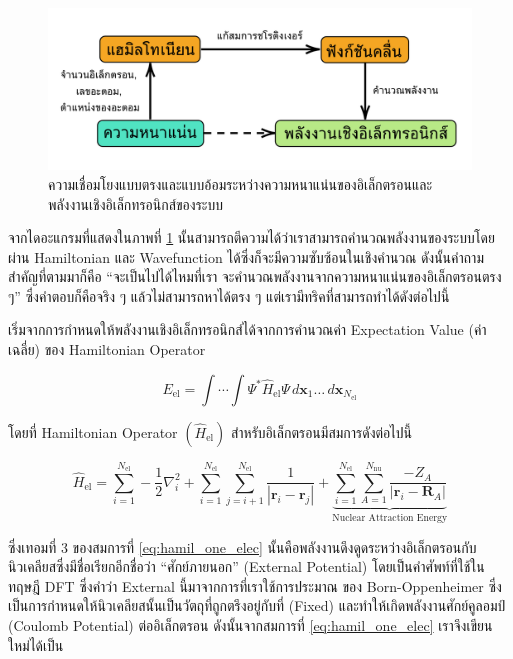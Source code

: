 \begin{figure}[htbp]
    \centering
    \includegraphics[width=\linewidth]{fig/density_wavefunc_ener.png}
    \caption{ความเชื่อมโยงแบบตรงและแบบอ้อมระหว่างความหนาแน่นของอิเล็กตรอนและพลังงานเชิงอิเล็กทรอนิกส์ของระบบ}
    \label{fig:density_wavefunc_ener}
\end{figure}

จากไดอะแกรมที่แสดงในภาพที่ \ref{fig:density_wavefunc_ener} นั้นสามารถตีความได้ว่าเราสามารถคำนวณพลังงานของระบบโดยผ่าน 
Hamiltonian และ Wavefunction ได้ซึ่งก็จะมีความซับซ้อนในเชิงคำนวณ ดังนั้นคำถามสำคัญที่ตามมาก็คือ \enquote{จะเป็นไปได้ไหมที่เรา%
จะคำนวณพลังงานจากความหนาแน่นของอิเล็กตรอนตรง ๆ} ซึ่งคำตอบก็คือจริง ๆ แล้วไม่สามารถหาได้ตรง ๆ แต่เรามีทริคที่สามารถทำได้ดังต่อไปนี้

เริ่มจากการกำหนดให้พลังงานเชิงอิเล็กทรอนิกส์ได้จากการคำนวณค่า Expectation Value (ค่าเฉลี่ย) ของ Hamiltonian Operator 

\begin{equation}\label{eq:ener_expect_value}
    E_{\text{el}} = \int \cdots \int \Psi^{\ast} \hat{H}_{\text{el}} \Psi \, d\bm{x}_{1} \dots \, 
    d\bm{x}_{N_{\text{el}}}
\end{equation}

\noindent โดยที่ Hamiltonian Operator $(\hat{H}_{\text{el}})$ สำหรับอิเล็กตรอนมีสมการดังต่อไปนี้

\begin{equation}\label{eq:hamil_one_elec}
    \hat{H}_{\text{el}} = \sum^{N_{\text{el}}}_{i=1} -\frac{1}{2} \nabla^{2}_{i} 
    + \sum^{N_{\text{el}}}_{i=1} \sum^{N_{\text{el}}}_{j=i+1} \frac{1}{|\bm{r}_{i}-\bm{r}_{j}|}
    + \underbrace{\sum^{N_{\text{el}}}_{i=1} \sum^{N_{\text{nu}}}_{A=1} \frac{-Z_{A}}{|\bm{r}_{i}-\bm{R}_{A}|}}%
    _{\text{Nuclear Attraction Energy}}
\end{equation}

\noindent ซึ่งเทอมที่ 3 ของสมการที่ \ref{eq:hamil_one_elec} นั้นคือพลังงานดึงดูดระหว่างอิเล็กตรอนกับนิวเคลียสซึ่งมีชื่อเรียกอีกชื่อว่า 
\enquote{ศักย์ภายนอก} (External Potential) โดยเป็นคำศัพท์ที่ใช้ในทฤษฎี DFT ซึ่งคำว่า External นี้มาจากการที่เราใช้การประมาณ%
ของ Born-Oppenheimer ซึ่งเป็นการกำหนดให้นิวเคลียสนั้นเป็นวัตถุที่ถูกตรึงอยู่กับที่ (Fixed) และทำให้เกิดพลังงานศักย์คูลอมป์ (Coulomb 
Potential) ต่ออิเล็กตรอน ดังนั้นจากสมการที่ \ref{eq:hamil_one_elec} เราจึงเขียนใหม่ได้เป็น 

